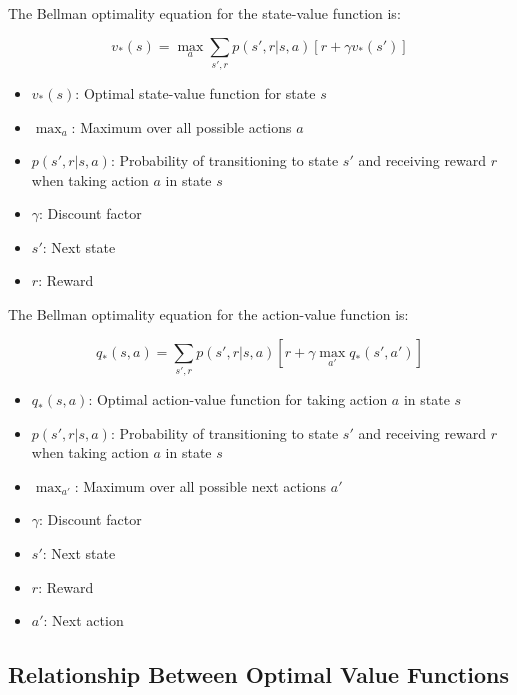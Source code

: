 \documentclass{article}
\begin{document}
The Bellman optimality equation for the state-value function is:

\begin{equation}
v_*(s) = \max_a \sum_{s',r} p(s',r|s,a)[r + \gamma v_*(s')]
\end{equation}

\begin{tcolorbox}[colframe=blue!50!black, colback=blue!10, title=Notation Overview]
\begin{itemize}
    \item $v_*(s)$: Optimal state-value function for state $s$
    \item $\max_a$: Maximum over all possible actions $a$
    \item $p(s',r|s,a)$: Probability of transitioning to state $s'$ and receiving reward $r$ when taking action $a$ in state $s$
    \item $\gamma$: Discount factor
    \item $s'$: Next state
    \item $r$: Reward
\end{itemize}
\end{tcolorbox}

The Bellman optimality equation for the action-value function is:

\begin{equation}
q_*(s,a) = \sum_{s',r} p(s',r|s,a)[r + \gamma \max_{a'} q_*(s',a')]
\end{equation}

\begin{tcolorbox}[colframe=blue!50!black, colback=blue!10, title=Notation Overview]
\begin{itemize}
    \item $q_*(s,a)$: Optimal action-value function for taking action $a$ in state $s$
    \item $p(s',r|s,a)$: Probability of transitioning to state $s'$ and receiving reward $r$ when taking action $a$ in state $s$
    \item $\max_{a'}$: Maximum over all possible next actions $a'$
    \item $\gamma$: Discount factor
    \item $s'$: Next state
    \item $r$: Reward
    \item $a'$: Next action
\end{itemize}
\end{tcolorbox}

\subsection{Relationship Between Optimal Value Functions}
\end{document}
